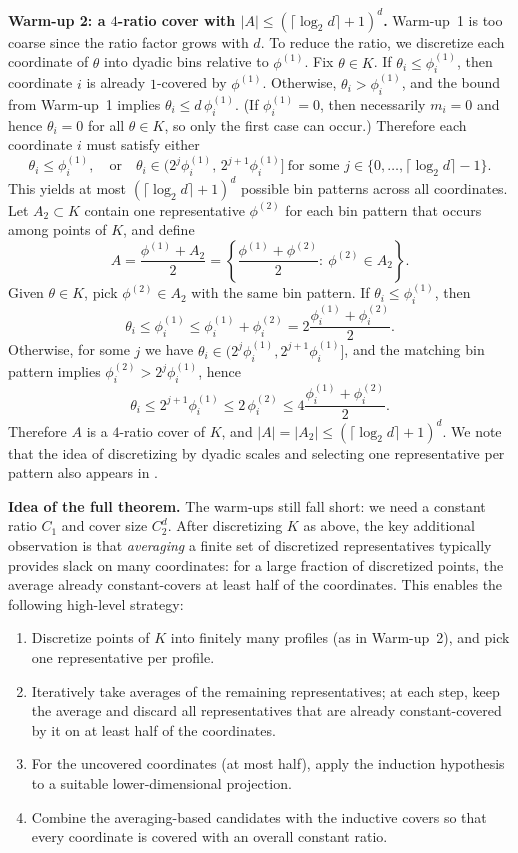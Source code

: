 \documentclass[11pt]{article}
\renewcommand{\le}{\leqslant}
\renewcommand{\triangleq}{=}
\theoremstyle{definition}
\theoremstyle{remark}
\begin{document}
\textbf{Warm-up 2: a $4$-ratio cover with $|A|\le (\lceil \log_2 d\rceil+1)^d$.}
Warm-up~1 is too coarse since the ratio factor grows with $d$.
To reduce the ratio, we discretize each coordinate of $\theta$ into dyadic bins relative to $\phi^{(1)}$.
Fix $\theta\in K$. If $\theta_i\le \phi^{(1)}_i$, then coordinate $i$ is already $1$-covered by $\phi^{(1)}$.
Otherwise, $\theta_i>\phi^{(1)}_i$, and the bound from Warm-up~1 implies $\theta_i\le d\,\phi^{(1)}_i$.
(If $\phi^{(1)}_i=0$, then necessarily $m_i=0$ and hence $\theta_i=0$ for all $\theta\in K$, so only the first case can occur.)
Therefore each coordinate $i$ must satisfy either
\[
\theta_i \le \phi^{(1)}_i,
\quad\text{or}\quad
\theta_i \in (2^j\phi^{(1)}_i,\,2^{j+1}\phi^{(1)}_i]
\ \text{for some }j\in\{0,\dots,\lceil\log_2 d\rceil-1\}.
\]
This yields at most $(\lceil\log_2 d\rceil+1)^d$ possible bin patterns across all coordinates.
Let $A_2\subset K$ contain one representative $\phi^{(2)}$ for each bin pattern that occurs among points of $K$, and define
\[
A \triangleq \frac{\phi^{(1)}+A_2}{2}
= \left\{\frac{\phi^{(1)}+\phi^{(2)}}{2}:\ \phi^{(2)}\in A_2\right\}.
\]
Given $\theta\in K$, pick $\phi^{(2)}\in A_2$ with the same bin pattern.
If $\theta_i\le \phi^{(1)}_i$, then
\[
\theta_i \le \phi^{(1)}_i \le \phi^{(1)}_i+\phi^{(2)}_i
= 2\frac{\phi^{(1)}_i+\phi^{(2)}_i}{2}.
\]
Otherwise, for some $j$ we have $\theta_i\in(2^j\phi^{(1)}_i,2^{j+1}\phi^{(1)}_i]$, and the matching bin pattern implies $\phi^{(2)}_i>2^j\phi^{(1)}_i$, hence
\[
\theta_i \le 2^{j+1}\phi^{(1)}_i \le 2\,\phi^{(2)}_i
\le 4\frac{\phi^{(1)}_i+\phi^{(2)}_i}{2}.
\]
Therefore $A$ is a $4$-ratio cover of $K$, and
$|A|= |A_2|\le (\lceil\log_2 d\rceil+1)^d$.
We note that the idea of discretizing by dyadic scales and selecting one representative per pattern also appears in \cite{papadimitriou2000approximability}.

\textbf{Idea of the full theorem.}
The warm-ups still fall short: we need a constant ratio $C_1$ and cover size $C_2^d$.
After discretizing $K$ as above, the key additional observation is that \emph{averaging} a finite set of discretized representatives typically provides slack on many coordinates: for a large fraction of discretized points, the average already constant-covers at least half of the coordinates.
This enables the following high-level strategy:
\begin{enumerate}
    \item Discretize points of $K$ into finitely many profiles (as in Warm-up~2), and pick one representative per profile.
    \item Iteratively take averages of the remaining representatives; at each step, keep the average and discard all representatives that are already constant-covered by it on at least half of the coordinates.
    \item For the uncovered coordinates (at most half), apply the induction hypothesis to a suitable lower-dimensional projection.
    \item Combine the averaging-based candidates with the inductive covers so that every coordinate is covered with an overall constant ratio.
\end{enumerate}
\end{document}
